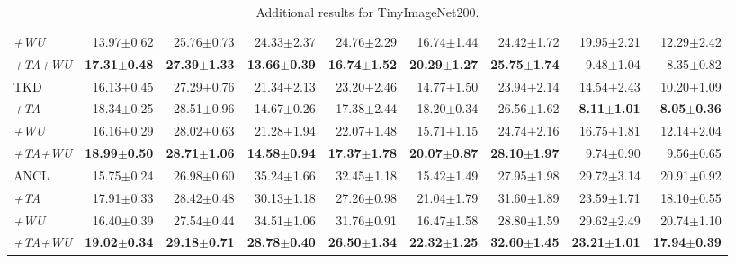 \begin{appendix}
\begin{table*}[!th]
{\begin{tabular}{lrrrrrrrr}
\textit{+WU} &
  13.97$\pm$0.62 &
  25.76$\pm$0.73 &
  24.33$\pm$2.37 &
  24.76$\pm$2.29 &
  16.74$\pm$1.44 &
  24.42$\pm$1.72 &
  19.95$\pm$2.21 &
  12.29$\pm$2.42 \\
\textit{+TA+WU} &
  \textbf{17.31$\pm$0.48} &
  \textbf{27.39$\pm$1.33} &
  \textbf{13.66$\pm$0.39} &
  \textbf{16.74$\pm$1.52} &
  \textbf{20.29$\pm$1.27} &
  \textbf{25.75$\pm$1.74} &
  9.48$\pm$1.04 &
  8.35$\pm$0.82 \\ \midrule
TKD &
  16.13$\pm$0.45 &
  27.29$\pm$0.76 &
  21.34$\pm$2.13 &
  23.20$\pm$2.46 &
  14.77$\pm$1.50 &
  23.94$\pm$2.14 &
  14.54$\pm$2.43 &
  10.20$\pm$1.09 \\
\textit{+TA} &
  18.34$\pm$0.25 &
  28.51$\pm$0.96 &
  14.67$\pm$0.26 &
  17.38$\pm$2.44 &
  18.20$\pm$0.34 &
  26.56$\pm$1.62 &
  \textbf{8.11$\pm$1.01} &
  \textbf{8.05$\pm$0.36} \\
\textit{+WU} &
  16.16$\pm$0.29 &
  28.02$\pm$0.63 &
  21.28$\pm$1.94 &
  22.07$\pm$1.48 &
  15.71$\pm$1.15 &
  24.74$\pm$2.16 &
  16.75$\pm$1.81 &
  12.14$\pm$2.04 \\
\textit{+TA+WU} &
  \textbf{18.99$\pm$0.50} &
  \textbf{28.71$\pm$1.06} &
  \textbf{14.58$\pm$0.94} &
  \textbf{17.37$\pm$1.78} &
  \textbf{20.07$\pm$0.87} &
  \textbf{28.10$\pm$1.97} &
  9.74$\pm$0.90 &
  9.56$\pm$0.65 \\ \midrule
ANCL &
  15.75$\pm$0.24 &
  26.98$\pm$0.60 &
  35.24$\pm$1.66 &
  32.45$\pm$1.18 &
  15.42$\pm$1.49 &
  27.95$\pm$1.98 &
  29.72$\pm$3.14 &
  20.91$\pm$0.92 \\
\textit{+TA} &
  17.91$\pm$0.33 &
  28.42$\pm$0.48 &
  30.13$\pm$1.18 &
  27.26$\pm$0.98 &
  21.04$\pm$1.79 &
  31.60$\pm$1.89 &
  23.59$\pm$1.71 &
  18.10$\pm$0.55 \\
\textit{+WU} &
  16.40$\pm$0.39 &
  27.54$\pm$0.44 &
  34.51$\pm$1.06 &
  31.76$\pm$0.91 &
  16.47$\pm$1.58 &
  28.80$\pm$1.59 &
  29.62$\pm$2.49 &
  20.74$\pm$1.10 \\
\textit{+TA+WU} &
  \textbf{19.02$\pm$0.34} &
  \textbf{29.18$\pm$0.71} &
  \textbf{28.78$\pm$0.40} &
  \textbf{26.50$\pm$1.34} &
  \textbf{22.32$\pm$1.25} &
  \textbf{32.60$\pm$1.45} &
  \textbf{23.21$\pm$1.01} &
  \textbf{17.94$\pm$0.39} \\ \bottomrule
\end{tabular}%
}
\caption{Additional results for TinyImageNet200.}
\label{tab:app:tin200}
\end{table*}




\end{appendix}
